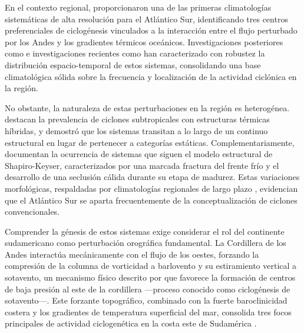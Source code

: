 En el contexto regional, \citet{reboita2010south} proporcionaron una de las primeras climatologías sistemáticas de alta resolución para el Atlántico Sur, identificando tres centros preferenciales de ciclogénesis vinculados a la interacción entre el flujo perturbado por los Andes y los gradientes térmicos oceánicos. Investigaciones posteriores como \citet{gramcianinov2020analysis} e investigaciones recientes como \citet{padilhareinke2026characterization} han caracterizado con robustez la distribución espacio-temporal de estos sistemas, consolidando una base climatológica sólida sobre la frecuencia y localización de la actividad ciclónica en la región.

No obstante, la naturaleza de estas perturbaciones en la región es heterogénea. \citet{evans2012climatology} destacan la prevalencia de ciclones subtropicales con estructuras térmicas híbridas, y \citet{hart2003cyclone} demostró que los sistemas transitan a lo largo de un continuo estructural en lugar de pertenecer a categorías estáticas. Complementariamente, \citet{gozzo2013air} documentan la ocurrencia de sistemas que siguen el modelo estructural de Shapiro-Keyser, caracterizados por una marcada fractura del frente frío y el desarrollo de una seclusión cálida durante su etapa de madurez. Estas variaciones morfológicas, respaldadas por climatologías regionales de largo plazo \citep{gozzo2014subtropical}, evidencian que el Atlántico Sur se aparta frecuentemente de la conceptualización de ciclones convencionales.

Comprender la génesis de estos sistemas exige considerar el rol del continente sudamericano como perturbación orográfica fundamental. La Cordillera de los Andes interactúa mecánicamente con el flujo de los oestes, forzando la compresión de la columna de vorticidad a barlovento y su estiramiento vertical a sotavento, un mecanismo físico descrito por \citet{gan1994influence} que favorece la formación de centros de baja presión al este de la cordillera —proceso conocido como ciclogénesis de sotavento—. Este forzante topográfico, combinado con la fuerte baroclinicidad costera y los gradientes de temperatura superficial del mar, consolida tres focos principales de actividad ciclogenética en la costa este de Sudamérica \citep{reboita2026meteorology}.

